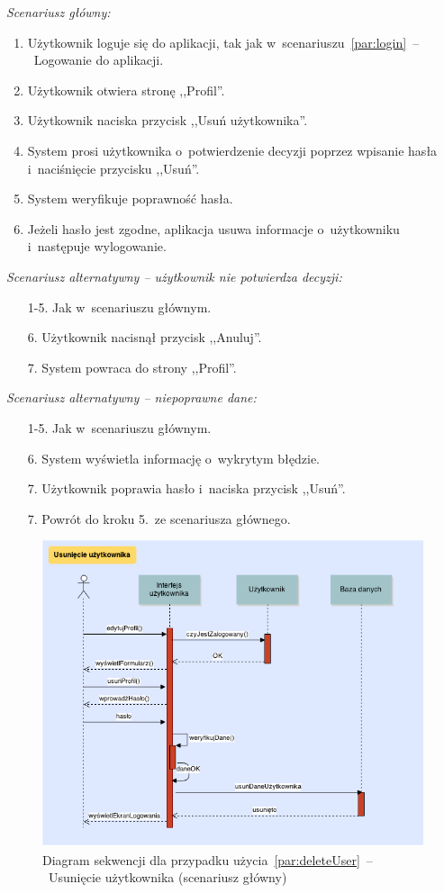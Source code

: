 \noindent \textit{Scenariusz główny:}
\begin{enumerate}
  \item Użytkownik loguje się do aplikacji, tak jak w~scenariuszu~\ref{par:login}~--~Logowanie do aplikacji.
  \item Użytkownik otwiera stronę ,,Profil''.
  \item Użytkownik naciska przycisk ,,Usuń użytkownika''.
  \item System prosi użytkownika o~potwierdzenie decyzji poprzez wpisanie hasła i~naciśnięcie przycisku ,,Usuń''.
  \item System weryfikuje poprawność hasła.
  \item Jeżeli hasło jest zgodne, aplikacja usuwa informacje o~użytkowniku i~następuje wylogowanie.
\end{enumerate}

\noindent \textit{Scenariusz alternatywny -- użytkownik nie potwierdza decyzji:}
\begin{enumerate}
  \item[1-5.] Jak w~scenariuszu głównym.
  \item[6.] Użytkownik nacisnął przycisk ,,Anuluj''.
  \item[7.] System powraca do strony ,,Profil''.
\end{enumerate}

\noindent \textit{Scenariusz alternatywny -- niepoprawne dane:}
\begin{enumerate}
  \item[1-5.] Jak w~scenariuszu głównym.
  \item[6.] System wyświetla informację o~wykrytym błędzie.
  \item[7.] Użytkownik poprawia hasło i~naciska przycisk ,,Usuń''.
  \item[7.] Powrót do kroku 5.~ze scenariusza głównego.
\end{enumerate}

\begin{figure}[H]
  \includegraphics[width=\textwidth]{images/usun_uzytkownika.png}
  \caption{Diagram sekwencji dla przypadku użycia~\ref{par:deleteUser}~--~Usunięcie użytkownika (scenariusz główny)}
\end{figure}


